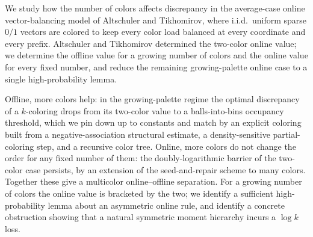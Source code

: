 We study how the number of colors affects discrepancy in the average-case online vector-balancing model of Altschuler and
Tikhomirov, where i.i.d.\ uniform sparse $0/1$ vectors are colored to keep every color load balanced at every coordinate
and every prefix. Altschuler and Tikhomirov determined the two-color online value; we determine the offline value for a
growing number of colors and the online value for every fixed number, and reduce the remaining growing-palette online case
to a single high-probability lemma.

Offline, more colors help: in the growing-palette regime the optimal discrepancy of a $k$-coloring drops from its two-color
value to a balls-into-bins occupancy threshold, which we pin down up to constants and match by an explicit coloring built
from a negative-association structural estimate, a density-sensitive partial-coloring step, and a recursive color tree.
Online, more colors do not change the order for any fixed number of them: the doubly-logarithmic barrier of the two-color
case persists, by an extension of the seed-and-repair scheme to many colors. Together these give a multicolor
online--offline separation. For a growing number of colors the online value is bracketed by the two; we identify a sufficient
high-probability lemma about an asymmetric online rule, and identify a concrete obstruction showing that a natural symmetric
moment hierarchy incurs a $\log k$ loss.
